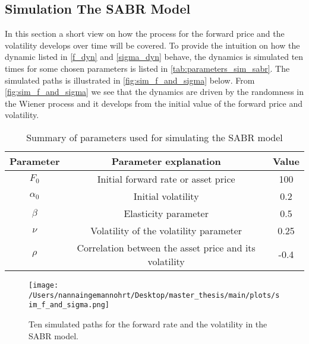 \subsection{Simulation The SABR Model}
In this section a short view on how the process for the forward price and the volatility develops over time will be covered. 
To provide the intuition on how the dynamic listed in \autoref{f_dyn} and \autoref{sigma_dyn} behave, the dynamics is simulated ten times
for some chosen parameters is listed in \autoref{tab:parameters_sim_sabr}. 
The simulated paths is illustrated in \autoref{fig:sim_f_and_sigma} below. 
From \autoref{fig:sim_f_and_sigma} we see that the dynamics are driven by the randomness in the Wiener process and 
it develops from the initial value of the forward price and volatility.
\\
\begin{table}[H]
    \centering
    \begin{tabular}{ccc}
      \toprule
      \textbf{Parameter} & \textbf{Parameter explanation} & \textbf{Value} \\
      \midrule
      \rowcolor{lightgray!40}  $F_0$ & Initial forward rate or asset price & 100 \\
      $\alpha_0$ & Initial volatility  & 0.2 \\
      \rowcolor{lightgray!40}  $\beta$ & Elasticity parameter & 0.5 \\
      $\nu$ & Volatility of the volatility parameter & 0.25 \\
      \rowcolor{lightgray!40} $\rho$ & Correlation between the asset price and its volatility & -0.4 \\
      \bottomrule
    \end{tabular}
    \caption{Summary of parameters used for simulating the SABR model}
    \label{tab:parameters_sim_sabr}
\end{table}
\noindent

\begin{figure}[H]
    \centering
    \texttt{[image: /Users/nannaingemannohrt/Desktop/master\_thesis/main/plots/sim\_f\_and\_sigma.png]}
    \caption{Ten simulated paths for the forward rate and the volatility in the SABR model.}
    \label{fig:sim_f_and_sigma}
\end{figure}
\noindent
